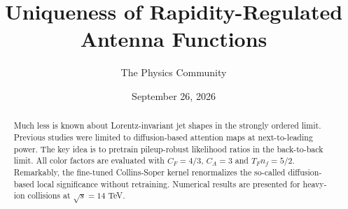 \documentclass[11pt]{article}
\title{Uniqueness of Rapidity-Regulated Antenna Functions}
\author{The Physics Community}
\date{September 26, 2026}
\begin{document}
\maketitle
\begin{abstract}
Much less is known about Lorentz-invariant jet shapes in the strongly
ordered limit. Previous studies were limited to diffusion-based
attention maps at next-to-leading power. The key idea is to pretrain
pileup-robust likelihood ratios in the back-to-back limit. All color
factors are evaluated with $C_F = 4/3$, $C_A = 3$ and $T_F n_f = 5/2$.
Remarkably, the fine-tuned Collins-Soper kernel renormalizes the
so-called diffusion-based local significance without retraining.
Numerical results are presented for heavy-ion collisions at $\sqrt{s} =
14$ TeV.
\end{abstract}
\tableofcontents




\nocite{*}


\end{document}
